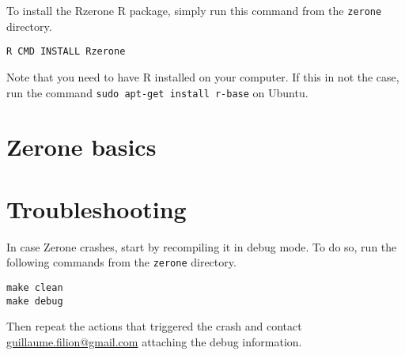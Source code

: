 \documentclass[12pt]{article}
\begin{document}
To install the Rzerone R package, simply run this command from the
\texttt{zerone} directory.

\begin{verbatim}
R CMD INSTALL Rzerone
\end{verbatim}

Note that you need to have R installed on your computer. If this in not the
case, run the command \texttt{sudo apt-get install r-base} on Ubuntu.

\section{Zerone basics}

\section{Troubleshooting}

In case Zerone crashes, start by recompiling it in debug mode. To do so,
run the following commands from the \texttt{zerone} directory.

\begin{verbatim}
make clean
make debug
\end{verbatim}

Then repeat the actions that triggered the crash and contact
\href{mailto:guillaume.filion@gmail.com}{guillaume.filion@gmail.com}
attaching the debug information.

\end{document}
